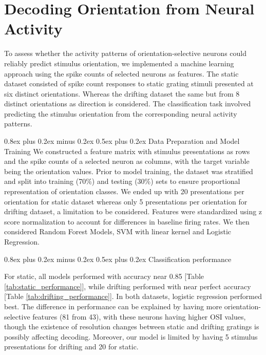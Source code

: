 \documentclass[10pt,twocolumn]{article}
\makeatletter
\renewcommand{\subsection}{\@startsection{subsection}{2}{\z@}%
  {0.8ex plus 0.2ex minus 0.2ex}%
  {0.5ex plus 0.2ex}%
  {\normalfont\normalsize\bfseries}}
\makeatother
\begin{document}
\section{Decoding Orientation from Neural Activity}

To assess whether the activity patterns of orientation-selective neurons could reliably predict stimulus orientation, we implemented a machine learning approach using the spike counts of selected neurons as features. The static dataset consisted of spike count responses to static grating stimuli presented at six distinct orientations. Whereas the drifting dataset the same but from 8 distinct orientations as direction is considered. The classification task involved predicting the stimulus orientation from the corresponding neural activity patterns.

\subsection{Data Preparation and Model Training}
We constructed a feature matrix with stimulus presentations as rows and the spike counts of a selected neuron as columns, with the target variable being the orientation values. Prior to model training, the dataset was stratified and split into training (70\%) and testing (30\%) sets to ensure proportional representation of orientation classes. We ended up with 20 presentations per orientation for static dataset whereas only 5 presentations per orientation for drifting dataset, a limitation to be considered. Features were standardized using z score normalization to account for differences in baseline firing rates. We then considered Random Forest Models, SVM with linear kernel and Logistic Regression.

\subsection{Classification performance}

For static, all models performed with accuracy near 0.85 [Table \ref{tab:static_performance}], while drifting performed with near perfect accuracy [Table \ref{tab:drifting_performance}]. In both datasets, logistic regression performed best. The difference in performance can be explained by having more orientation-selective features (81 from 43), with these neurons having higher OSI values, though the existence of resolution changes between static and drifting gratings is possibly affecting decoding. Moreover, our model is limited by having 5 stimulus presentations for drifting and 20 for static.
\end{document}
